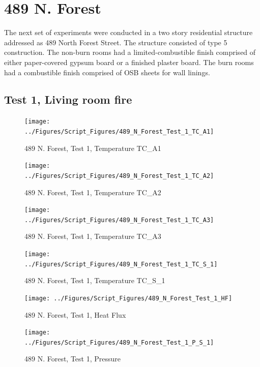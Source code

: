 \documentclass[12pt,oneside]{book}
\begin{document}
\clearpage


\section{489 N. Forest}

The next set of experiments were conducted in a two story residential structure addressed as 489 North Forest Street.  The structure consisted of type 5 construction.  The non-burn rooms had a limited-combustible finish comprised of either paper-covered gypsum board or a finished plaster board.  The burn rooms had a combustible finish comprised of OSB sheets for wall linings.  

\subsection{Test 1, Living room fire}



\begin{figure}[!ht]
\texttt{[image: ../Figures/Script\_Figures/489\_N\_Forest\_Test\_1\_TC\_A1]}
\caption{489 N. Forest, Test 1, Temperature TC\_A1}
\label{fig:489_N_Forest_Test_1_TC_A1}
\end{figure}

\begin{figure}[!ht]
\texttt{[image: ../Figures/Script\_Figures/489\_N\_Forest\_Test\_1\_TC\_A2]}
\caption{489 N. Forest, Test 1, Temperature TC\_A2}
\label{fig:489_N_Forest_Test_1_TC_A2}
\end{figure}

\begin{figure}[!ht]
\texttt{[image: ../Figures/Script\_Figures/489\_N\_Forest\_Test\_1\_TC\_A3]}
\caption{489 N. Forest, Test 1, Temperature TC\_A3}
\label{fig:489_N_Forest_Test_1_TC_A3}
\end{figure}

\begin{figure}[!ht]
\texttt{[image: ../Figures/Script\_Figures/489\_N\_Forest\_Test\_1\_TC\_S\_1]}
\caption{489 N. Forest, Test 1, Temperature TC\_S\_1}
\label{fig:489_N_Forest_Test_1_TC_S_1}
\end{figure}

\begin{figure}[!ht]
\texttt{[image: ../Figures/Script\_Figures/489\_N\_Forest\_Test\_1\_HF]}
\caption{489 N. Forest, Test 1, Heat Flux}
\label{fig:489_N_Forest_Test_1_HF}
\end{figure}

\begin{figure}[!ht]
\texttt{[image: ../Figures/Script\_Figures/489\_N\_Forest\_Test\_1\_P\_S\_1]}
\caption{489 N. Forest, Test 1, Pressure}
\label{fig:489_N_Forest_Test_1_P_S_1}
\end{figure}
\end{document}
